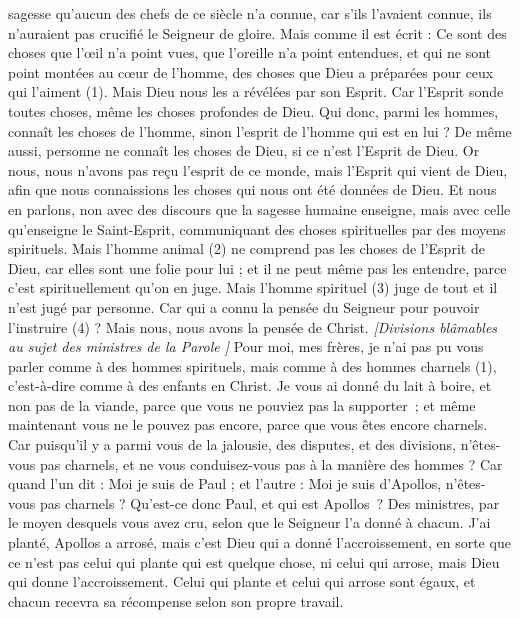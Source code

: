 \begin{multicols}{2}
sagesse qu’aucun des chefs de ce siècle n'a connue, car s'ils l’avaient connue, ils n’auraient pas crucifié le Seigneur de gloire.
Mais comme il est écrit : Ce sont des choses que l’œil n'a point vues, que l'oreille n'a point entendues, et qui ne sont point montées au cœur de l'homme, des choses que Dieu a préparées pour ceux qui l’aiment (1).
Mais Dieu nous les a révélées par son Esprit. Car l'Esprit sonde toutes choses, même les choses profondes de Dieu.
Qui donc, parmi les hommes, connaît les choses de l'homme, sinon l’esprit de l'homme qui est en lui ? De même aussi, personne ne connaît les choses de Dieu, si ce n’est l'Esprit de Dieu.
Or nous, nous n’avons pas reçu l'esprit de ce monde, mais l'Esprit qui vient de Dieu, afin que nous connaissions les choses qui nous ont été données de Dieu.
Et nous en parlons, non avec des discours que la sagesse humaine enseigne, mais avec celle qu'enseigne le Saint-Esprit, communiquant des choses spirituelles par des moyens spirituels.
Mais l'homme animal (2) ne comprend pas les choses de l'Esprit de Dieu, car elles sont une folie pour lui ; et il ne peut même pas les entendre, parce c’est spirituellement qu’on en juge.
Mais l'homme spirituel (3) juge de tout et il n'est jugé par personne.
Car qui a connu la pensée du Seigneur pour pouvoir l’instruire (4) ? Mais nous, nous avons la pensée de Christ.
\textit{[Divisions blâmables au sujet des ministres de la Parole ]}
\VerseOne{}Pour moi, mes frères, je n'ai pas pu vous parler comme à des hommes spirituels, mais comme à des hommes charnels (1), c'est-à-dire comme à des enfants en Christ.
Je vous ai donné du lait à boire, et non pas de la viande, parce que vous ne pouviez pas la supporter ; et même maintenant vous ne le pouvez pas encore, parce que vous êtes encore charnels.
Car puisqu'il y a parmi vous de la jalousie, des disputes, et des divisions, n'êtes-vous pas charnels, et ne vous conduisez-vous pas à la manière des hommes ?
Car quand l'un dit : Moi je suis de Paul ; et l'autre : Moi je suis d'Apollos, n'êtes-vous pas charnels ?
Qu’est-ce donc Paul, et qui est Apollos ? Des ministres, par le moyen desquels vous avez cru, selon que le Seigneur l’a donné à chacun.
J'ai planté, Apollos a arrosé, mais c'est Dieu qui a donné l'accroissement,
en sorte que ce n’est pas celui qui plante qui est quelque chose, ni celui qui arrose, mais Dieu qui donne l'accroissement.
Celui qui plante et celui qui arrose sont égaux, et chacun recevra sa récompense selon son propre travail.

\end{multicols}
